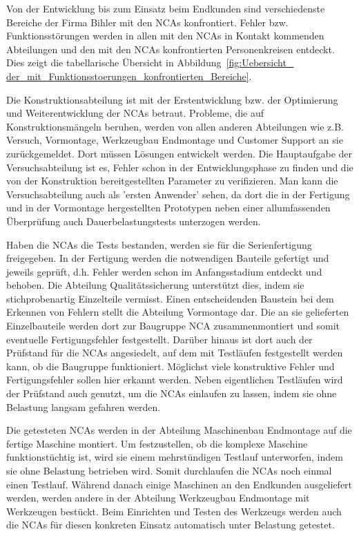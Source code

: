 Von der Entwicklung bis zum Einsatz beim Endkunden sind verschiedenste Bereiche der Firma Bihler mit den NCAs konfrontiert. Fehler bzw. Funktionsstörungen werden in allen mit den NCAs in Kontakt kommenden Abteilungen und den mit den NCAs konfrontierten Personenkreisen entdeckt. Dies zeigt die tabellarische Übersicht in Abbildung~\ref{fig:Uebersicht_ der_mit_Funktionsstoerungen_konfrontierten_Bereiche}.

Die Konstruktionsabteilung ist mit der Erstentwicklung bzw. der Optimierung und Weiterentwicklung der NCAs betraut. Probleme, die auf Konstruktionsmängeln beruhen, werden von allen anderen Abteilungen wie z.B. Versuch, Vormontage, Werkzeugbau Endmontage und Customer Support an sie zurückgemeldet. Dort müssen Lösungen entwickelt werden. Die Hauptaufgabe der Versuchsabteilung ist es,  Fehler schon in der Entwicklungsphase zu finden und die von der Konstruktion bereitgestellten Parameter zu verifizieren. Man kann die Versuchsabteilung auch als 'ersten Anwender' sehen, da dort die in der Fertigung und in der Vormontage hergestellten Prototypen neben einer allumfassenden Überprüfung auch Dauerbelastungstests unterzogen werden. 

Haben die NCAs die Tests bestanden, werden sie für die Serienfertigung freigegeben. In der Fertigung werden die notwendigen Bauteile gefertigt und jeweils geprüft, d.h. Fehler werden schon im Anfangsstadium entdeckt und behoben. Die Abteilung Qualitätssicherung unterstützt dies, indem sie stichprobenartig Einzelteile vermisst. Einen entscheidenden Baustein bei dem Erkennen von Fehlern stellt die Abteilung Vormontage dar. Die an sie gelieferten Einzelbauteile werden dort zur Baugruppe NCA zusammenmontiert und somit eventuelle Fertigungsfehler festgestellt. Darüber hinaus ist dort auch der Prüfstand für die NCAs angesiedelt, auf dem mit Testläufen festgestellt werden kann, ob die Baugruppe funktioniert. Möglichst viele konstruktive Fehler und Fertigungsfehler sollen hier erkannt werden. Neben eigentlichen Testläufen wird der Prüfstand auch genutzt, um die NCAs einlaufen zu lassen, indem sie ohne Belastung langsam gefahren werden.

Die getesteten NCAs werden in der Abteilung Maschinenbau Endmontage auf die fertige Maschine montiert. Um festzustellen, ob die komplexe Maschine funktionstüchtig ist, wird sie einem mehrstündigen Testlauf unterworfen, indem sie ohne Belastung betrieben wird. Somit durchlaufen die NCAs noch einmal einen Testlauf. Während danach einige Maschinen an den Endkunden ausgeliefert werden, werden andere in der Abteilung Werkzeugbau Endmontage mit Werkzeugen bestückt. Beim Einrichten und Testen des Werkzeugs werden auch die NCAs für diesen konkreten Einsatz automatisch unter Belastung getestet.  


